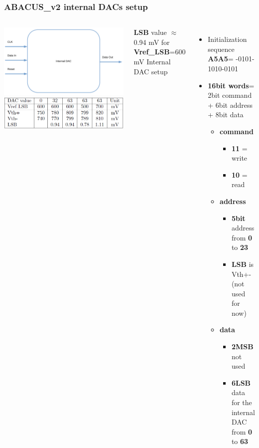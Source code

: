 \documentclass[aspectratio=169]{beamer}
\begin{document}
	\begin{frame}
		\frametitle{ABACUS\_v2 internal DACs setup}	
		\begin{columns}
			\begin{center}
				\includegraphics[width=0.7 \textwidth]{IMG/InternalDAC.pdf}
				\includegraphics[width=0.7 \textwidth]{IMG/TableLSB.PNG}
			\end{center}
			\textbf{LSB} value $\approx$0.94 mV for \textbf{Vref\_LSB}=600 mV
			{\color{blue} Internal DAC setup}
			\begin{itemize}
				\item Initialization sequence \textbf{A5A5}= 
				-0101-1010-0101
				\item \textbf{16bit words}= \newline 2bit command + 6bit address + 8bit data
				\begin{itemize}
					\item \textbf{command}
					\begin{itemize}
						\item \textbf{11} = write
						\item \textbf{10} = read
					\end{itemize}
					\item \textbf{address}
					\begin{itemize}
						\item \textbf{5bit} address from \textbf{0} to \textbf{23}
						\item \textbf{LSB} is Vth+- (not used for now)
					\end{itemize}
					\item \textbf{data}
					\begin{itemize}
						\item \textbf{2MSB} not used
						\item \textbf{6LSB} data for the internal DAC \newline from \textbf{0} to \textbf{63}
					\end{itemize}
				\end{itemize} 
			\end{itemize}
		\end{columns}
	\end{frame}
\end{document}
